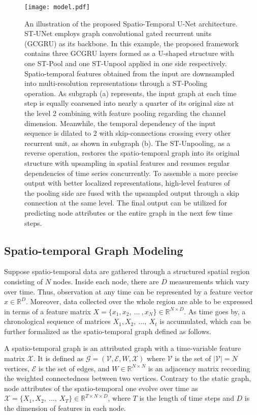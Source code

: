 \documentclass[sigconf,screen]{acmart}
\begin{document}
\begin{figure*}
  \centering
  \texttt{[image: model.pdf]}
  \caption{\label{fig:model}An illustration of the proposed Spatio-Temporal U-Net architecture. ST-UNet employs graph convolutional gated recurrent units (GCGRU) as its backbone. In this example, the proposed framework contains three GCGRU layers formed as a U-shaped structure with one ST-Pool and one ST-Unpool applied in one side respectively. Spatio-temporal features obtained from the input are downsampled into multi-resolution representations through a ST-Pooling operation. As subgraph (a) represents, the input graph at each time step is equally coarsened into nearly a quarter of its original size at the level 2 combining with feature pooling regarding the channel dimension. Meanwhile, the temporal dependency of the input sequence is dilated to 2 with skip-connections crossing every other recurrent unit, as shown in subgraph (b). The ST-Unpooling, as a reverse operation, restores the spatio-temporal graph into its original structure with upsampling in spatial features and resumes regular dependencies of time series concurrently. To assemble a more precise output with better localized representations, high-level features of the pooling side are fused with the upsampled output through a skip connection at the same level. The final output can be utilized for predicting node attributes or the entire graph in the next few time steps.}
\end{figure*}

\subsection{Spatio-temporal Graph Modeling}
Suppose spatio-temporal data are gathered through a structured spatial region consisting of $N$ nodes. Inside each node, there are $D$ measurements which vary over time. Thus, observation at any time can be represented by a feature vector $x \in \mathbb{R}^{D}$. Moreover, data collected over the whole region are able to be expressed in terms of a feature matrix $X = \{x_1, x_2,~\ldots~,x_N\} \in \mathbb{R}^{N \times D}$. As time goes by, a chronological sequence of matrices $X_1, X_2,~\ldots,~X_t$ is accumulated, which can be further formalized as the spatio-temporal graph defined as follows.

\begin{definition} 
A spatio-temporal graph is an attributed graph with a time-variable feature matrix $\mathcal{X}$. It is defined as $\mathcal{G} = (\mathcal{V}, \mathcal{E}, W, \mathcal{X})$ where $\mathcal{V}$ is the set of $|\mathcal{V}|=N$ vertices, $\mathcal{E}$ is the set of edges, and $W \in \mathbb{R}^{N \times N}$ is an adjacency matrix recording the weighted connectedness between two vertices. Contrary to the static graph, node attributes of the spatio-temporal one evolve over time as $\mathcal{X} = \{X_1, X_2,~\ldots,~X_T\} \in \mathbb{R}^{T \times N \times D}$, where $T$ is the length of time steps and $D$ is the dimension of features in each node.
\end{definition}
\end{document}
